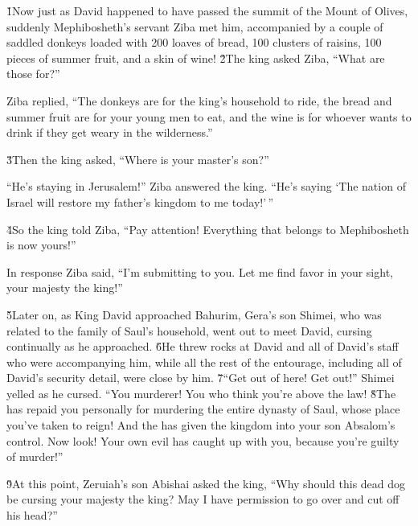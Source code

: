 \v{1}Now just as David happened to have passed the summit of the Mount of Olives, suddenly Mephibosheth's servant Ziba met him, accompanied by a couple of saddled donkeys loaded with 200 loaves of bread, 100 clusters of raisins, 100 pieces of summer fruit, and a skin of wine! \v{2}The king asked Ziba, ``What are those for?''

Ziba replied, ``The donkeys are for the king's household to ride, the bread and summer fruit are for your young men to eat, and the wine is for whoever wants to drink if they get weary in the wilderness.''

\v{3}Then the king asked, ``Where is your master's son?''

``He's staying in Jerusalem!'' Ziba answered the king. ``He's saying `The nation of Israel will restore my father's kingdom to me today!'\,''

\v{4}So the king told Ziba, ``Pay attention! Everything that belongs to Mephibosheth is now yours!''

In response Ziba said, ``I'm submitting to you. Let me find favor in your sight, your majesty the king!''

\v{5}Later on, as King David approached Bahurim, Gera's son Shimei, who was related to the family of Saul's household, went out to meet David, cursing continually as he approached. \v{6}He threw rocks at David and all of David's staff who were accompanying him, while all the rest of the entourage, including all of David's security detail, were close by him. \v{7}``Get out of here! Get out!'' Shimei yelled as he cursed. ``You murderer! You who think you're above the law! \v{8}The  has repaid you personally for murdering the entire dynasty of Saul, whose place you've taken to reign! And the  has given the kingdom into your son Absalom's control. Now look! Your own evil has caught up with you, because you're guilty of murder!''

\v{9}At this point, Zeruiah's son Abishai asked the king, ``Why should this dead dog be cursing your majesty the king? May I have permission to go over and cut off his head?''

